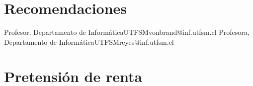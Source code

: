 \documentclass[letter,10pt]{moderncv}
\makeatletter
\renewcommand*{\bibliographyitemlabel}{\@biblabel{\arabic{enumiv}}}
\makeatother
\begin{document}
\section{Recomendaciones}
        {Profesor, Departamento de Informática}{UTFSM}{vonbrand@inf.utfsm.cl}{}
        {Profesora, Departamento de Informática}{UTFSM}{reyes@inf.utfsm.cl}{}

\section{Pretensión de renta}

\nocite{*}                                                                           
                                                            
\end{document}
